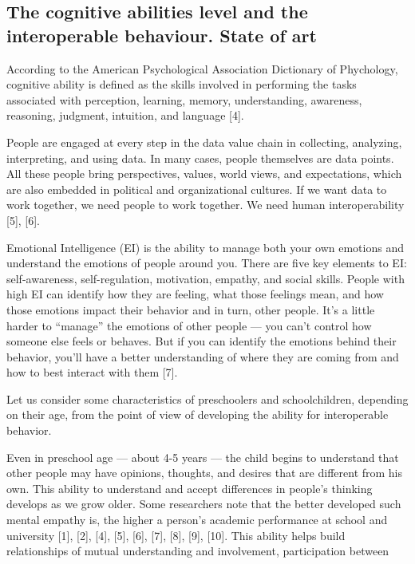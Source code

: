 \documentclass{article}
\begin{document}
\begin{multicols}{2}
\section{\hspace{-0.5em} The cognitive abilities level and the interoperable
behaviour. State of art}
\hspace{1em}According to the American Psychological Association
Dictionary of Phychology, cognitive ability is defined as
the skills involved in performing the tasks associated with
perception, learning, memory, understanding, awareness,
reasoning, judgment, intuition, and language [4].
\par People are engaged at every step in the data value
chain in collecting, analyzing, interpreting, and using
data. In many cases, people themselves are data points.
All these people bring perspectives, values, world views,
and expectations, which are also embedded in political
and organizational cultures. If we want data to work
together, we need people to work together. We need
human interoperability [5], [6].
\par Emotional Intelligence (EI) is the ability to manage
both your own emotions and understand the emotions of
people around you. There are five key elements to EI:
self-awareness, self-regulation, motivation, empathy, and
social skills. People with high EI can identify how they
are feeling, what those feelings mean, and how those
emotions impact their behavior and in turn, other people.
It’s a little harder to “manage” the emotions of other
people — you can’t control how someone else feels or
\newpage
behaves. But if you can identify the emotions behind their
behavior, you’ll have a better understanding of where
they are coming from and how to best interact with
them [7].
\par Let us consider some characteristics of preschoolers
and schoolchildren, depending on their age, from the
point of view of developing the ability for interoperable
behavior.
\par Even in preschool age — about 4-5 years — the
child begins to understand that other people may have
opinions, thoughts, and desires that are different from his
own. This ability to understand and accept differences
in people’s thinking develops as we grow older. Some
researchers note that the better developed such mental
empathy is, the higher a person’s academic performance
at school and university [1], [2], [4], [5], [6], [7], [8],
[9], [10]. This ability helps build relationships of mutual
understanding and involvement, participation between

\end{multicols}
\end{document}
